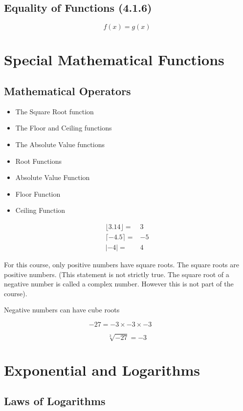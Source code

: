 \documentclass[a4paper,12pt]{article}
\begin{document}
\subsection*{Equality of Functions (4.1.6)}
\[f(x) = g(x) \]

\section{Special Mathematical Functions}
\subsection{Mathematical Operators}
\begin{itemize}
\item The Square Root function
\item The Floor and Ceiling functions
\item The Absolute Value functions
\end{itemize}


\begin{itemize}
\item Root Functions
\item Absolute Value Function
\item Floor Function
\item Ceiling Function
\end{itemize}
{

\begin{eqnarray}
\lfloor 3.14 \rfloor =& 3 \\
\lceil -4.5 \rceil =& -5 \\
| -4 | =&  4
\end{eqnarray}
}
For this course, only positive numbers have square roots. The square roots are positive numbers. (This statement is not strictly true. The square root of a negative number is called a complex number. However this is not part of the course).

Negative numbers can have cube roots

{
\[ -27 = -3 \times -3 \times -3 \qquad \]

\[ \sqrt[3]{-27} = -3 \]
}

\newpage
\section{Exponential and Logarithms}
\subsection*{Laws of Logarithms}
\end{document}

